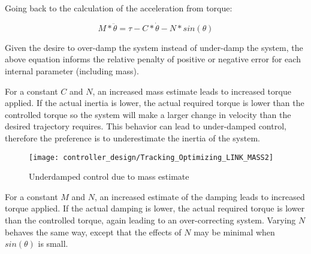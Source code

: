 Going back to the calculation of the acceleration from torque:

\begin{equation}
M * \ddot{\theta} = \tau - C * \dot{\theta} - N * sin(\theta)
\end{equation}

Given the desire to over-damp the system instead of under-damp the system, the
above equation informs the relative penalty of positive or negative error for
each internal parameter (including mass).

For a constant $C$ and $N$, an increased mass estimate leads to increased torque
applied. If the actual inertia is lower, the actual required torque is lower 
than the controlled torque so the system will make a larger change in velocity 
than the desired trajectory requires. This behavior can lead to under-damped 
control, therefore the preference is to underestimate the inertia of the system.

\begin{figure}
\centering
\texttt{[image: controller\_design/Tracking\_Optimizing\_LINK\_MASS2]}
\caption{Underdamped control due to mass estimate}
\label{fig:UnderdampedControl}
\end{figure}


For a constant $M$ and $N$, an increased estimate of the damping leads to 
increased torque applied. If the actual damping is lower, the actual required
torque is lower than the controlled torque, again leading to an over-correcting
system. Varying $N$ behaves the same way, except that the effects of $N$ may be
minimal when $sin(\theta)$ is small.
